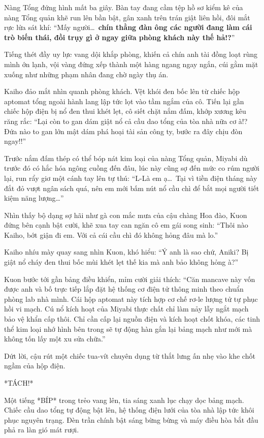 \documentclass[../main.tex]{subfiles}
\begin{document}
Nàng Tổng đứng hình mất ba giây. Bàn tay đang cầm tệp hồ sơ kiểm kê của nàng Tổng quản khẽ run lên bần bật, gân xanh trên trán giật liên hồi, đôi mắt rực lửa sát khí: ``Mấy người\dots\ \textbf{chín thằng đàn ông các người đang làm cái trò biến thái, đồi trụy gì ở ngay giữa phòng khách này thế hả!?}''

Tiếng thét đầy uy lực vang dội khắp phòng, khiến cả chín anh tài đồng loạt rùng mình ớn lạnh, vội vàng đứng xếp thành một hàng ngang ngay ngắn, cúi gằm mặt xuống như những phạm nhân đang chờ ngày thụ án.

Kaiho đảo mắt nhìn quanh phòng khách. Vệt khói đen bốc lên từ chiếc hộp aptomat tổng ngoài hành lang lập tức lọt vào tầm ngắm của cô. Tiến lại gần chiếc hộp điện bị nổ đen thui khét lẹt, cô siết chặt nắm đấm, khớp xương kêu răng rắc: ``Lại còn to gan dám giật nổ cả cầu dao tổng của tòa nhà nữa cơ à!? Đứa nào to gan lớn mật dám phá hoại tài sản công ty, bước ra đây chịu đòn ngay!!''

Trước nắm đấm thép có thể bóp nát kim loại của nàng Tổng quản, Miyabi dù trước đó có hắc hóa ngông cuồng đến đâu, lúc này cũng sợ đến mức co rúm người lại, run rẩy giơ một cánh tay lên tự thú: ``L-Là em ạ\dots\ Tại vì tiền điện tháng này đắt đỏ vượt ngân sách quá, nên em mới bấm nút nổ cầu chì để bắt mọi người tiết kiệm năng lượng\dots''

Nhìn thấy bộ dạng sợ hãi như gà con mắc mưa của cậu chàng Hoa đào, Kuon đứng bên cạnh bật cười, khẽ xua tay can ngăn cô em gái song sinh: ``Thôi nào Kaiho, bớt giận đi em. Với cả cái cầu chì đó không hỏng đâu mà lo.''

Kaiho nhíu mày quay sang nhìn Kuon, khó hiểu: ``Ý anh là sao chứ, Aniki? Bị giật nổ cháy đen thui bốc mùi khét lẹt thế kia mà anh bảo không hỏng à?''

Kuon bước tới gần bảng điều khiển, mỉm cười giải thích: ``Căn mancave này vốn được anh và bố trực tiếp lắp đặt hệ thống cơ điện tử thông minh theo chuẩn phòng lab nhà mình. Cái hộp aptomat này tích hợp cơ chế rơ-le lượng tử tự phục hồi vi mạch. Cú nổ kích hoạt của Miyabi thực chất chỉ làm nảy lẫy ngắt mạch bảo vệ khẩn cấp thôi. Chỉ cần cấp lại nguồn điện và kích hoạt chốt khóa, các tinh thể kim loại nhớ hình bên trong sẽ tự động hàn gắn lại bảng mạch như mới mà không tốn lấy một xu sửa chữa.''

Dứt lời, cậu rút một chiếc tua-vít chuyên dụng từ thắt lưng ấn nhẹ vào khe chốt ngầm của hộp điện.

*TÁCH!*

Một tiếng *BÍP* trong trẻo vang lên, tia sáng xanh lục chạy dọc bảng mạch. Chiếc cầu dao tổng tự động bật lên, hệ thống điện lưới của tòa nhà lập tức khôi phục nguyên trạng. Đèn trần chính bật sáng bừng bừng và máy điều hòa bắt đầu phả ra làn gió mát rượi.
\end{document}
